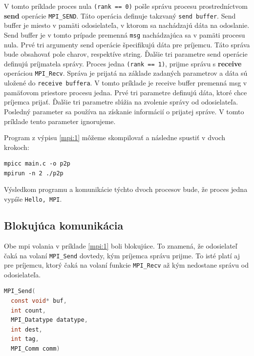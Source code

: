 V tomto príklade proces nula \texttt{(rank == 0)} pošle správu procesu prostredníctvom \textbf{send} operácie \texttt{MPI\_SEND}.
Táto operácia definuje takzvaný \texttt{send buffer}. Send buffer je miesto v pamäti
odosielateľa, v ktorom sa nachádzajú dáta na odoslanie.
Send buffer je v tomto prípade premenná \texttt{msg} nachádzajúca sa v pamäti procesu nula.
Prvé tri argumenty send operácie špecifikujú dáta pre príjemcu. Táto správa bude obsahovať pole charov, respektíve string.
Ďalšie tri parametre send operácie definujú príjmatela správy.
Proces jedna \texttt{(rank == 1)}, prijme správu s \textbf{receive} operáciou \texttt{MPI\_Recv}.
Správa je prijatá na základe zadaných parametrov a dáta sú uložené do \texttt{receive buffera}.
V tomto príklade je receive buffer premenná msg v pamäťovom priestore procesu jedna.
Prvé tri parametre definujú dáta, ktoré chce príjemca prijať. Ďalšie tri parametre slúžia na zvolenie správy od odosielateľa.
Posledný parameter sa používa na získanie informácií o prijatej správe. V tomto príklade tento parameter ignorujeme.

Program z výpisu \ref{mpi:1} môžeme skompilovať a následne spustiť v dvoch krokoch:
\begin{lstlisting}
mpicc main.c -o p2p
mpirun -n 2 ./p2p
\end{lstlisting}
Výsledkom programu a komunikácie týchto dvoch procesov bude, že proces jedna vypíše \texttt{Hello, MPI}.

\subsection{Blokujúca komunikácia}
Obe \acrshort{mpi} volania v príklade \ref{mpi:1} boli blokujúce.
To znamená, že odosielateľ čaká na volaní \texttt{MPI\_Send} dovtedy, kým príjemca správu prijme.
To isté platí aj pre príjemcu, ktorý čaká na volaní funkcie \texttt{MPI\_Recv}  až kým nedostane správu od odosielateľa.

\begin{lstlisting}[language=c, caption={MPI\_Send}, label={mpi:send}]
  MPI_Send(
  const void* buf,
  int count,
  MPI_Datatype datatype,
  int dest,
  int tag,
  MPI_Comm comm)
\end{lstlisting}

